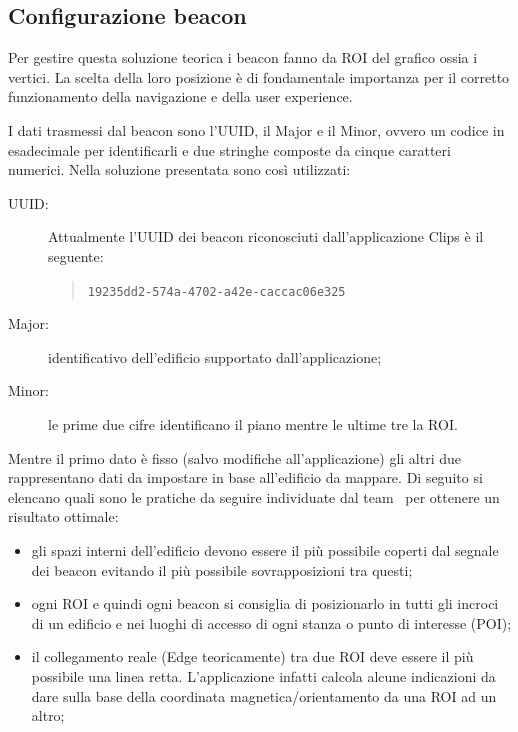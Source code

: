 \documentclass[../ManualeSviluppatore.tex]{subfiles}
\begin{document}
		
	\subsection{Configurazione beacon}
	\label{subsec:ConfigurazioneBeacon}
		Per gestire questa soluzione teorica i beacon fanno da ROI del grafico ossia i vertici. La scelta della loro posizione è di fondamentale importanza per il corretto funzionamento della navigazione e della user experience. 

		I dati trasmessi dal \gls{beacon} sono l'UUID, il Major e il Minor, ovvero un codice in esadecimale per identificarli e due stringhe composte da cinque caratteri numerici. Nella soluzione presentata sono così utilizzati:
		\begin{description}
			\item[UUID:] Attualmente l'UUID dei beacon riconosciuti dall'applicazione Clips è il seguente:
				\begin{quote}
					\verb|19235dd2-574a-4702-a42e-caccac06e325|
				\end{quote}
			\item[Major:] identificativo dell'edificio supportato dall'applicazione;
			\item[Minor:] le prime due cifre identificano il piano mentre le ultime tre la ROI.
		\end{description}			
		
		Mentre il primo dato è fisso (salvo modifiche all'applicazione) gli altri due rappresentano dati da impostare in base all'edificio da mappare. Di seguito si elencano quali sono le pratiche da seguire individuate dal team \leaf\ per ottenere un risultato ottimale:
		\begin{itemize}
			\item gli spazi interni dell'edificio devono essere il più possibile coperti dal segnale dei \gls{beacon} evitando il più possibile sovrapposizioni tra questi;
			\item ogni ROI e quindi ogni \gls{beacon} si consiglia di posizionarlo in tutti gli incroci di un edificio e nei luoghi di accesso di ogni stanza o punto di interesse (POI);
			\item il collegamento reale (Edge teoricamente) tra due ROI deve essere il più possibile una linea retta. L'applicazione infatti calcola alcune indicazioni da dare sulla base della coordinata magnetica/orientamento da una ROI ad un altro;
		\end{itemize}
\end{document}
